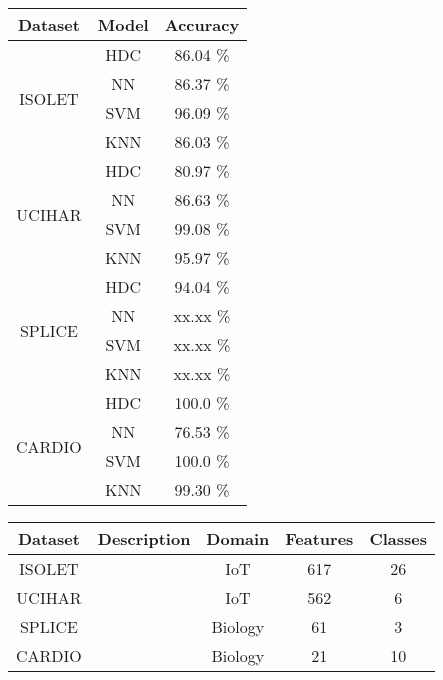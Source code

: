 \documentclass{standalone}
\begin{document}
    \begin{tabular}{|c|c|c|}
        \hline
        \textbf{Dataset} & \textbf{Model} & \textbf{Accuracy} \\
        \hline
        \multirow{4}{*}{ISOLET} & HDC   & 86.04 \% \\
                                & NN    & 86.37 \% \\
                                & SVM   & 96.09 \% \\
                                & KNN   & 86.03 \% \\
        \hline
        \multirow{4}{*}{UCIHAR} & HDC   & 80.97 \% \\
                                & NN    & 86.63 \% \\
                                & SVM   & 99.08 \% \\
                                & KNN   & 95.97 \% \\
        \hline
        \multirow{4}{*}{SPLICE} & HDC   & 94.04 \% \\
                                & NN    & xx.xx \% \\
                                & SVM   & xx.xx \% \\
                                & KNN   & xx.xx \% \\
        \hline
        \multirow{4}{*}{CARDIO} & HDC   & 100.0 \% \\
                                & NN    & 76.53 \% \\
                                & SVM   & 100.0 \% \\
                                & KNN   & 99.30 \% \\
        \hline
    \end{tabular}

    \begin{tabular}{|c|c|c|c|c|}
        \hline
        \textbf{Dataset} & \textbf{Description} & \textbf{Domain} & \textbf{Features} & \textbf{Classes} \\
        \hline
        ISOLET & & IoT        & 617   & 26 \\
        \hline
        UCIHAR & & IoT        & 562   & 6 \\
        \hline
        SPLICE & & Biology    & 61    & 3 \\
        \hline
        CARDIO & & Biology    & 21    & 10 \\
        \hline
    \end{tabular}
\end{document}
